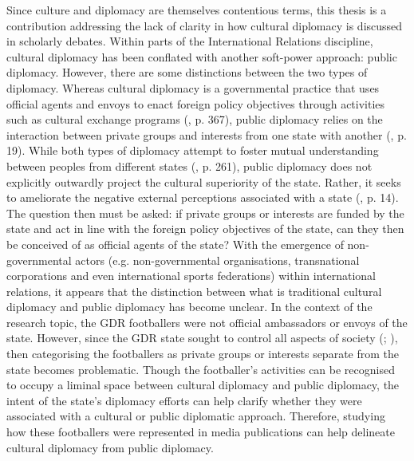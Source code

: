 Since culture and diplomacy are themselves contentious terms, this thesis is a contribution addressing the lack of clarity in how cultural diplomacy is discussed in scholarly debates. Within parts of the International Relations discipline, cultural diplomacy has been conflated with another soft-power approach: public diplomacy. However, there are some distinctions between the two types of diplomacy. Whereas cultural diplomacy is a governmental practice that uses official agents and envoys to enact foreign policy objectives through activities such as cultural exchange programs (\cite{ang2015}, p. 367), public diplomacy relies on the interaction between private groups and interests from one state with another (\cite{cull2008b}, p. 19). While both types of diplomacy attempt to foster mutual understanding between peoples from different states (\cite{hartig2016}, p. 261), public diplomacy does not explicitly outwardly project the cultural superiority of the state. Rather, it seeks to ameliorate the negative external perceptions associated with a state (\cite{melissen2011}, p. 14). The question then must be asked: if private groups or interests are funded by the state and act in line with the foreign policy objectives of the state, can they then be conceived of as official agents of the state? With the emergence of non-governmental actors (e.g. non-governmental organisations, transnational corporations and even international sports federations) within international relations, it appears that the distinction between what is traditional cultural diplomacy and public diplomacy has become unclear. In the context of the research topic, the GDR footballers were not official ambassadors or envoys of the state. However, since the GDR state sought to control all aspects of society (\cite{fullbrook1995}; \cite{dennis2000}), then categorising the footballers as private groups or interests separate from the state becomes problematic. Though the footballer’s activities can be recognised to occupy a liminal space between cultural diplomacy and public diplomacy, the intent of the state’s diplomacy efforts can help clarify whether they were associated with a cultural or public diplomatic approach. Therefore, studying how these footballers were represented in media publications can help delineate cultural diplomacy from public diplomacy.

